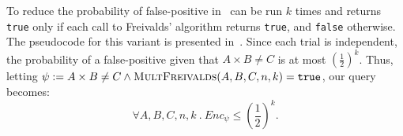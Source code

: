 \documentclass[acmsmall,review,anonymous]{acmart}\settopmatter{printfolios=true,printccs=false,printacmref=false}
\newcommand*\Let[2]{\State #1 $\gets$ #2}
\begin{document}
To reduce the probability of false-positive in~ can be run $k$ times and returns \texttt{true} only if each call to Freivalds' algorithm returns \texttt{true}, and \texttt{false} otherwise.
% 
The pseudocode for this variant is presented in~.
% 
Since each trial is independent, the probability of a false-positive given that $A \times B \neq C$ is at most $\left(\frac{1}{2}\right)^k$.
% 
Thus, letting $\psi := A \times B \neq C \wedge \textsc{MultFreivalds}(A,B,C,n,k) = \texttt{true}$, our query becomes:
% 
\begin{equation*}
	\forall A,B,C,n,k~.~Enc_\psi \leq \left(\frac{1}{2}\right)^k.
\end{equation*}



\end{document}
